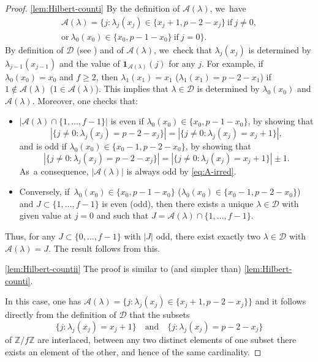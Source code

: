 \documentclass[JEP,XML,SOM,Unicode,NoFloatCountersInSection, NoEqCountersInSection,published]{cedram}
\newcommand{\quand}{\quad\text{and}\quad}
\newcommand{\Z}{{\mathbb Z}}
\newcommand{\D}{\mathscr D}
\theoremstyle{plain}
\theoremstyle{definition}
\begin{document}
\skpt
\begin{proof}
\eqref{lem:Hilbert-counti} By the definition of $\mathcal{A}(\lambda)$, we~have
\begin{multline}\label{eq:A-irred}\mathcal{A}(\lambda)= \bigl\{j: \lambda_j(x_j)\in\{x_j+1,p-2-x_j\}\ \text{if}\ j\neq 0,\\
\text{or}\ \lambda_0(x_0)\in \{x_0,p-1-x_0\}\ \text{if}\ j=0\bigl\}.
\end{multline}
By definition of $\D$ (see \cite[\S 11]{BP}) and of $\mathcal{A}(\lambda)$, we~check that $\lambda_{j}(x_{j})$ is determined by $\lambda_{j-1}(x_{j-1})$ and the value of $\mathbf{1}_{\mathcal{A}(\lambda)}(j)$ for any $j$.
For example, if~$\lambda_0(x_0)=x_0$ and $f \ge 2$, then $\lambda_1(x_1)=x_1$ (\resp $\lambda_1(x_1)=p-2-x_1$) if $1\notin \mathcal{A}(\lambda)$ (\resp $1\in \mathcal{A}(\lambda)$).
This implies that $\lambda\in \D$ is determined by $\lambda_0(x_0)$ and $\mathcal{A}(\lambda)$. Moreover, one checks that:
\begin{itemize}
\item $|\mathcal{A}(\lambda)\cap \{1,\dots,f-1\}|$ is even if $\lambda_0(x_0)\in \{x_0,p-1-x_0\}$, by showing that
\[
|\{j\neq 0:\lambda_j(x_j)=p-2-x_j\}|=|\{j\neq0:\lambda_j(x_j)=x_j+1\}|,
\]
and is odd if $\lambda_0(x_0)\in \{x_0-1,p-2-x_0\}$, by showing that
\[
|\{j\neq 0:\lambda_j(x_j)=p-2-x_j\}|=|\{j\neq0:\lambda_j(x_j)=x_j+1\}|\pm 1.
\]
As~a consequence, $|\mathcal{A}(\lambda)|$ is always odd by \eqref{eq:A-irred}.
\item Conversely, if~$\lambda_0(x_0)\in \{x_0,p-1-x_0\}$ (\resp $\lambda_0(x_0)\in\{x_0-1,p-2-x_0\}$) and $J\subset \{1,\dots,f-1\}$ is even (\resp odd), then there exists a unique $\lambda\in \D$ with given value at $j=0$ and such that $J=\mathcal{A}(\lambda)\cap \{1,\dots,f-1\}$.
\end{itemize}

Thus, for any $J\subset \{0,\dots,f-1\}$ with $|J|$ odd, there exist exactly two $\lambda\in \D$ with $\mathcal{A}(\lambda)=J$. The result follows from this.

\eqref{lem:Hilbert-countii} The proof is similar to (and simpler than) \eqref{lem:Hilbert-counti}.

In this case, one has $\mathcal{A}(\lambda)=\{j:\lambda_j(x_j)\in\{x_j+1,p-2-x_j\}\}$ and it follows directly from the definition of $\D$ that the subsets
\[
\{j:\lambda_j(x_j)=x_j+1\}\quand\{j:\lambda_j(x_j)=p-2-x_j\}
\]
of $\Z/f\Z$ are interlaced, \ie between any two distinct elements of one subset there exists an element of the other, and hence of the same cardinality.


\end{proof}
\end{document}
